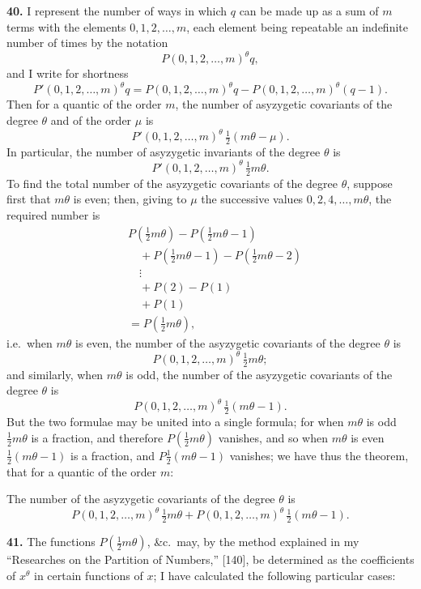 \documentclass[11pt]{article}
\begin{document}
\textbf{40.} I represent the number of ways in which $q$ can be made up as a sum of $m$ terms with the elements $0, 1, 2, \ldots, m$, each element being repeatable an indefinite number of times by the notation
\[
P(0, 1, 2, \ldots, m)^\theta q,
\]
and I write for shortness
\[
P'(0, 1, 2, \ldots, m)^\theta q = P(0, 1, 2, \ldots, m)^\theta q - P(0, 1, 2, \ldots, m)^\theta (q - 1).
\]
Then for a quantic of the order $m$, the number of asyzygetic covariants of the degree $\theta$ and of the order $\mu$ is
\[
P'(0, 1, 2, \ldots, m)^\theta\,\tfrac{1}{2}(m\theta - \mu).
\]
In particular, the number of asyzygetic invariants of the degree $\theta$ is
\[
P'(0, 1, 2, \ldots, m)^\theta\,\tfrac{1}{2}m\theta.
\]
To find the total number of the asyzygetic covariants of the degree $\theta$, suppose first that $m\theta$ is even; then, giving to $\mu$ the successive values $0, 2, 4, \ldots, m\theta$, the required number is
\begin{align*}
&P(\tfrac{1}{2}m\theta) - P(\tfrac{1}{2}m\theta - 1) \\
&\quad + P(\tfrac{1}{2}m\theta - 1) - P(\tfrac{1}{2}m\theta - 2) \\
&\quad \vdots \\
&\quad + P(2) - P(1) \\
&\quad + P(1) \\
&= P(\tfrac{1}{2}m\theta),
\end{align*}
i.e.\ when $m\theta$ is even, the number of the asyzygetic covariants of the degree $\theta$ is
\[
P(0, 1, 2, \ldots, m)^\theta\,\tfrac{1}{2}m\theta;
\]
and similarly, when $m\theta$ is odd, the number of the asyzygetic covariants of the degree $\theta$ is
\[
P(0, 1, 2, \ldots, m)^\theta\,\tfrac{1}{2}(m\theta - 1).
\]
But the two formulae may be united into a single formula; for when $m\theta$ is odd $\tfrac{1}{2}m\theta$ is a fraction, and therefore $P(\tfrac{1}{2}m\theta)$ vanishes, and so when $m\theta$ is even $\tfrac{1}{2}(m\theta - 1)$ is a fraction, and $P\tfrac{1}{2}(m\theta - 1)$ vanishes; we have thus the theorem, that for a quantic of the order $m$:

The number of the asyzygetic covariants of the degree $\theta$ is
\[
P(0, 1, 2, \ldots, m)^\theta\,\tfrac{1}{2}m\theta + P(0, 1, 2, \ldots, m)^\theta\,\tfrac{1}{2}(m\theta - 1).
\]

\textbf{41.} The functions $P(\tfrac{1}{2}m\theta)$, \&c.\ may, by the method explained in my ``Researches on the Partition of Numbers,'' [140], be determined as the coefficients of $x^\theta$ in certain functions of $x$; I have calculated the following particular cases:
\end{document}
